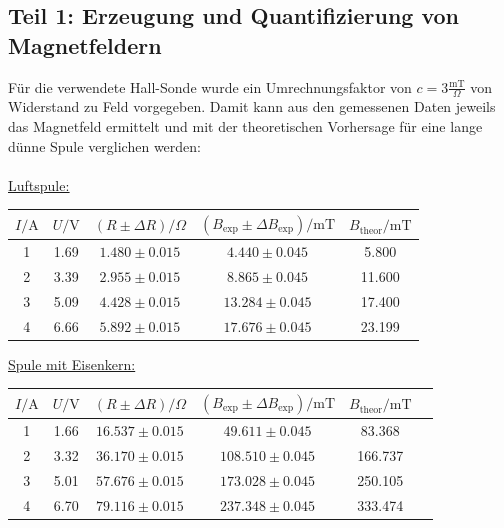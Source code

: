 \documentclass[german,  %
parskip=full,  %
]{scrartcl}
\begin{document}
\subsection{Teil 1: Erzeugung und Quantifizierung von Magnetfeldern}
Für die verwendete Hall-Sonde wurde ein Umrechnungsfaktor von \(c = 3 \frac{\mathrm{mT}}{\Omega}\) von Widerstand zu Feld vorgegeben. Damit kann aus den gemessenen Daten jeweils das Magnetfeld ermittelt und mit der theoretischen Vorhersage für eine lange dünne Spule verglichen werden: \\\\
\underline{\underline{Luftspule:}} 
\begin{table}[h!]
\begin{tabular}{|c|c|c|c|c|} 
\hline
\(I/ \mathrm{A}\) & \(U / \mathrm{V}\) & \((R \pm \Delta R )/ \Omega\) & \((B_{\mathrm{exp}} \pm \Delta B_{\mathrm{exp}}) / \mathrm{mT}\) & \(B_{\mathrm{theor}}  / \mathrm{mT}\)\\\hline
1 & 1.69 & \( 1.480 \pm 0.015 \) & \( 4.440 \pm 0.045 \) & 5.800 \\\hline
2 & 3.39 & \( 2.955 \pm 0.015 \) & \( 8.865 \pm 0.045 \) & 11.600 \\\hline
3 & 5.09 & \( 4.428 \pm 0.015 \) & \( 13.284 \pm 0.045 \) & 17.400 \\\hline
4 & 6.66 & \( 5.892 \pm 0.015 \) & \( 17.676 \pm 0.045 \) & 23.199 \\\hline
\end{tabular}
\end{table} 
\newpage
\underline{\underline{Spule mit Eisenkern:}} 
\begin{table}[h!]
\begin{tabular}{|c|c|c|c|c|c|} 
\hline
\(I/ \mathrm{A}\) & \(U / \mathrm{V}\) & \((R \pm \Delta R )/ \Omega\) & \((B_{\mathrm{exp}} \pm \Delta B_{\mathrm{exp}}) / \mathrm{mT}\)  & \(B_{\mathrm{theor}}  / \mathrm{mT}\) \\\hline
1 & 1.66 & \( 16.537 \pm 0.015 \) & \( 49.611 \pm 0.045 \) & 83.368 \\\hline
2 & 3.32 & \( 36.170 \pm 0.015 \) & \( 108.510 \pm 0.045 \) & 166.737 \\\hline
3 & 5.01 & \( 57.676 \pm 0.015 \) & \( 173.028 \pm 0.045 \) & 250.105 \\\hline
4 & 6.70 & \( 79.116 \pm 0.015 \) & \( 237.348 \pm 0.045 \) & 333.474 \\\hline
\end{tabular}
\end{table} \\\\
\end{document}
